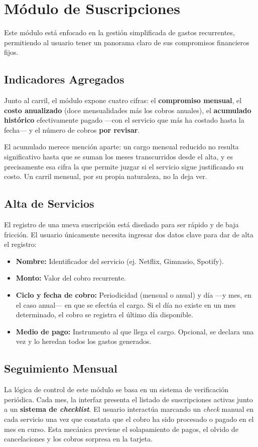 \section{Módulo de Suscripciones}
Este módulo está enfocado en la gestión simplificada de gastos recurrentes, permitiendo al usuario tener un panorama claro de sus compromisos financieros fijos.

\subsection{Indicadores Agregados}
Junto al carril, el módulo expone cuatro cifras: el \textbf{compromiso mensual}, el \textbf{costo anualizado} (doce mensualidades más los cobros anuales), el \textbf{acumulado histórico} efectivamente pagado —con el servicio que más ha costado hasta la fecha— y el número de cobros \textbf{por revisar}.

El acumulado merece mención aparte: un cargo mensual reducido no resulta significativo hasta que se suman los meses transcurridos desde el alta, y es precisamente esa cifra la que permite juzgar si el servicio sigue justificando su costo. Un carril mensual, por su propia naturaleza, no la deja ver.

\subsection{Alta de Servicios}
El registro de una nueva suscripción está diseñado para ser rápido y de baja fricción. El usuario únicamente necesita ingresar dos datos clave para dar de alta el registro:
\begin{itemize}
    \item \textbf{Nombre:} Identificador del servicio (ej. Netflix, Gimnasio, Spotify).
    \item \textbf{Monto:} Valor del cobro recurrente.
    \item \textbf{Ciclo y fecha de cobro:} Periodicidad (mensual o anual) y día —y mes, en el caso anual— en que se efectúa el cargo. Si el día no existe en un mes determinado, el cobro se registra el último día disponible.
    \item \textbf{Medio de pago:} Instrumento al que llega el cargo. Opcional, se declara una vez y lo heredan todos los gastos generados.
\end{itemize}

\subsection{Seguimiento Mensual}
La lógica de control de este módulo se basa en un sistema de verificación periódica. Cada mes, la interfaz presenta el listado de suscripciones activas junto a un \textbf{sistema de \textit{checklist}}. El usuario interactúa marcando un \textit{check} manual en cada servicio una vez que constata que el cobro ha sido procesado o pagado en el mes en curso. Esta mecánica previene el solapamiento de pagos, el olvido de cancelaciones y los cobros sorpresa en la tarjeta.

